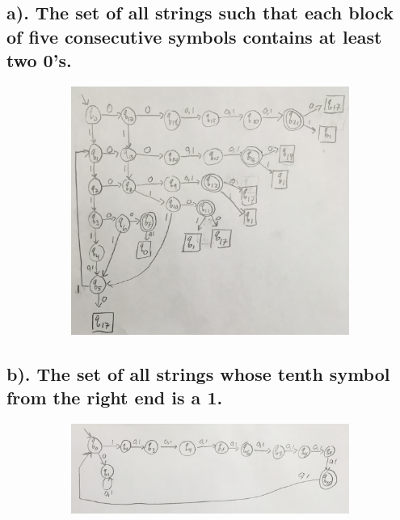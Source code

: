 \documentclass[20pt]{article} %
\begin{document}
\subsection{a). The set of all strings such that each block of five consecutive symbols contains at least two 0's.}
\begin{figure}[!htbp]
  	\centering
   	\begin{subfigure}[p]{0.8\linewidth}
    	\includegraphics[width=\linewidth]{./figures/H1-2a.jpg}
   	\end{subfigure}
\end{figure} 

\subsection{b). The set of all strings whose tenth symbol from the right end is a 1.}
\begin{figure}[!htbp]
  	\centering
   	\begin{subfigure}[p]{0.9\linewidth}
    	\includegraphics[width=\linewidth]{./figures/H1-2b.jpg}
   	\end{subfigure}
\end{figure} 
\end{document}
